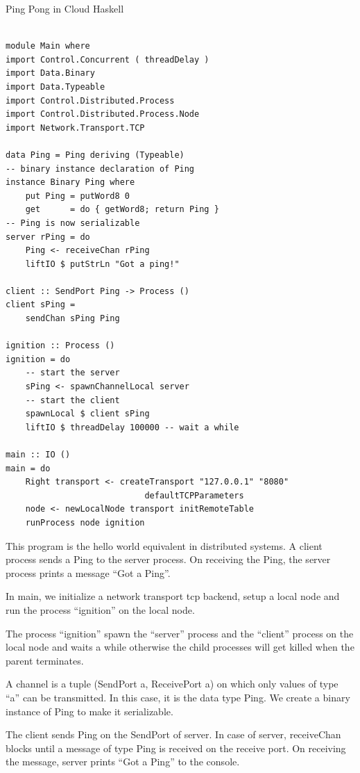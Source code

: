 \begin{program}

\caption[Ping Pong in Cloud Haskell]
{Ping Pong in Cloud Haskell}

\label{fig:ping-pong-intro}
\begin{verbatim}

module Main where
import Control.Concurrent ( threadDelay )
import Data.Binary
import Data.Typeable
import Control.Distributed.Process
import Control.Distributed.Process.Node
import Network.Transport.TCP

data Ping = Ping deriving (Typeable)
-- binary instance declaration of Ping
instance Binary Ping where
    put Ping = putWord8 0
    get      = do { getWord8; return Ping }
-- Ping is now serializable
server rPing = do
    Ping <- receiveChan rPing
    liftIO $ putStrLn "Got a ping!"

client :: SendPort Ping -> Process ()
client sPing =
    sendChan sPing Ping

ignition :: Process ()
ignition = do
    -- start the server
    sPing <- spawnChannelLocal server
    -- start the client
    spawnLocal $ client sPing
    liftIO $ threadDelay 100000 -- wait a while

main :: IO ()
main = do
    Right transport <- createTransport "127.0.0.1" "8080"
                            defaultTCPParameters
    node <- newLocalNode transport initRemoteTable
    runProcess node ignition

\end{verbatim}
\end{program}

This program is the hello world equivalent in distributed systems. A
client process sends a Ping to the server process. On receiving the
Ping, the server process prints a message ``Got a Ping''.

In main, we initialize a network transport tcp backend, setup a local
node and run the process ``ignition'' on the local node.

The process ``ignition'' spawn the ``server'' process and the
``client'' process on the local node and waits a while otherwise the
child processes will get killed when the parent terminates.

A channel is a tuple (SendPort a, ReceivePort a) on which only values
of type ``a'' can be transmitted. In this case, it is the data type
Ping. We create a binary instance of Ping to make it serializable.

The client sends Ping on the SendPort of server. In case of server,
receiveChan blocks until a message of type Ping is received on the
receive port. On receiving the message, server prints ``Got a Ping''
to the console.
